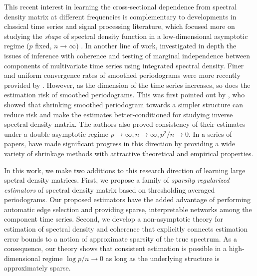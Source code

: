 This recent interest in learning the cross-sectional dependence from spectral density matrix at different frequencies is complementary to developments in classical time series and signal processing literature, which focused more on studying the \textit{shape} of spectral density function in a low-dimensional asymptotic regime ($p$ fixed, $n \rightarrow \infty$) \citep{brillinger1981time, brockwell2013time}.  In another line of work, \cite{dahlhaus1997identification, dahlhaus2003causality, eichler2007frequency} investigated in depth the issues of inference with coherence and testing of marginal independence between components of multivariate time series using integrated spectral density. Finer and uniform convergence rates of smoothed periodograms were more recently provided by \cite{wu2015uniform}. However, as the dimension of the time series increases, so does the estimation risk of smoothed periodograms. This was first pointed out by \cite{bohm2009shrinkage}, who showed that shrinking smoothed periodogram towards a simpler structure can reduce risk and make the estimates better-conditioned for studying inverse spectral density matrix. 
The authors also proved consistency of their estimates under a double-asymptotic regime $p \rightarrow \infty, n \rightarrow \infty, p^2/n \rightarrow 0$. In a series of papers, \citet{bohm2008structural,  fiecas2016dynamic,  fiecas2014datadriven} have made significant progress in this direction by providing a wide variety of shrinkage methods with attractive theoretical and empirical properties.

In this work, we make two additions  to this research direction of learning large spetral density matrices. First, we propose a family of \textit{sparsity regularized estimators} of spectral density matrix based on thresholding averaged periodograms. Our proposed estimators have the added advantage of performing  automatic edge selection and providing sparse, interpretable networks among the component time series. Second, we develop a non-asymptotic theory for estimation of  spectral density and coherence that explicitly connects estimation error bounds to a notion of approximate sparsity of the true spectrum. As a consequence, our theory shows that consistent estimation is possible in a high-dimensional regime $\log p / n \rightarrow 0$ as long as the underlying structure is approximately sparse. 

